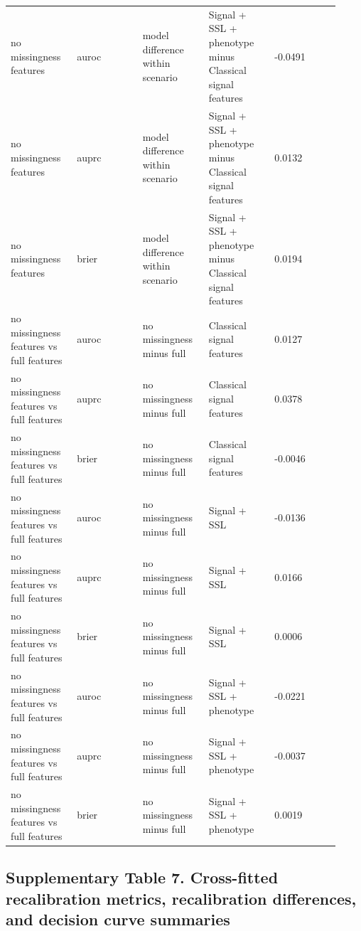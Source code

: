 \documentclass[utf8]{frontiers_suppmat}
\begin{document}
\begin{landscape}
\begin{longtable}{L{0.184\linewidth} L{0.184\linewidth} L{0.184\linewidth} L{0.184\linewidth} L{0.184\linewidth}}
no missingness features & auroc & model difference within scenario & Signal + SSL + phenotype minus Classical signal features & -\allowbreak{}0.\allowbreak{}0491 \\
no missingness features & auprc & model difference within scenario & Signal + SSL + phenotype minus Classical signal features & 0.\allowbreak{}0132 \\
no missingness features & brier & model difference within scenario & Signal + SSL + phenotype minus Classical signal features & 0.\allowbreak{}0194 \\
no missingness features vs full features & auroc & no missingness minus full & Classical signal features & 0.\allowbreak{}0127 \\
no missingness features vs full features & auprc & no missingness minus full & Classical signal features & 0.\allowbreak{}0378 \\
no missingness features vs full features & brier & no missingness minus full & Classical signal features & -\allowbreak{}0.\allowbreak{}0046 \\
no missingness features vs full features & auroc & no missingness minus full & Signal + SSL & -\allowbreak{}0.\allowbreak{}0136 \\
no missingness features vs full features & auprc & no missingness minus full & Signal + SSL & 0.\allowbreak{}0166 \\
no missingness features vs full features & brier & no missingness minus full & Signal + SSL & 0.\allowbreak{}0006 \\
no missingness features vs full features & auroc & no missingness minus full & Signal + SSL + phenotype & -\allowbreak{}0.\allowbreak{}0221 \\
no missingness features vs full features & auprc & no missingness minus full & Signal + SSL + phenotype & -\allowbreak{}0.\allowbreak{}0037 \\
no missingness features vs full features & brier & no missingness minus full & Signal + SSL + phenotype & 0.\allowbreak{}0019 \\
\end{longtable}
\normalsize
\end{landscape}


\clearpage

\subsection*{Supplementary Table 7. Cross-fitted recalibration metrics, recalibration differences, and decision curve summaries}
\end{document}
